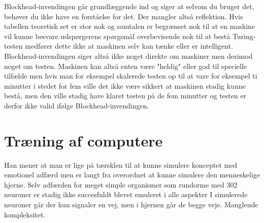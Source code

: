 \documentclass{article}
\begin{document}
Blockhead-invendingen går grundlæggende ind og siger at selvom du bruger det, behøver du ikke have en forståelse for det. Der mangler altså reflektion.
Hvis tabellen teoretisk set er stor nok og samtalen er begrænset nok til at en maskine vil kunne besvare udspørgerens spørgsmål overbevisende nok til at bestå Turing-testen medfører dette ikke at maskinen selv kan tænke eller er intelligent.
Blockhead-invendingen siger altså ikke noget direkte om maskiner men derimod noget om testen.
Maskinen kan altså enten være "heldig" eller god til specielle tilfælde men hvis man for eksempel skalerede testen op til at vare for eksempel ti minutter i stedet for fem ville det ikke være sikkert at maskinen stadig kunne bestå, men den ville stadig have klaret testen på de fem minutter og testen er derfor ikke valid ifølge Blockhead-invendingen.

\section{Træning af computere}
Han mener at man er lige på tærsklen til at kunne simulere konceptet med emotionel adfærd men er langt fra overordnet at kunne simulere den menneskelige hjerne.
Selv adfærden for meget simple organismer som rundorme med 302 neuroner er stadig ikke succesfuldt blevet emuleret i alle aspekter
I simulerede neuroner går der kun signaler en vej, men i hjernen går de begge veje. Manglende kompleksitet.
\end{document}
